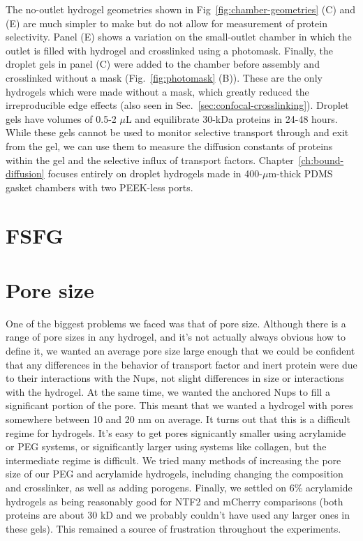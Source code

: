 The no-outlet hydrogel geometries shown in Fig~\ref{fig:chamber-geometries} (C) and (E) are much simpler to make but do not allow for measurement of protein selectivity.  Panel (E) shows a variation on the small-outlet chamber in which the outlet is filled with hydrogel and crosslinked using a photomask. Finally, the droplet gels in panel (C) were added to the chamber before assembly and crosslinked without a mask (Fig.~\ref{fig:photomask} (B)).  These are the only hydrogels which were made without a mask, which greatly reduced the irreproducible edge effects (also seen in Sec.~\ref{sec:confocal-crosslinking}).  Droplet gels have volumes of 0.5-2 $\mu$L and equilibrate 30-kDa proteins in 24-48 hours.  While these gels cannot be used to monitor selective transport through and exit from the gel, we can use them to measure the diffusion constants of proteins within the gel and the selective influx of transport factors.  Chapter~\ref{ch:bound-diffusion} focuses entirely on droplet hydrogels made in 400-$\mu$m-thick PDMS gasket chambers with two PEEK-less ports.

\section{FSFG}



\section{Pore size}

One of the biggest problems we faced was that of pore size.  Although there is a range of pore sizes in any hydrogel, and it's not actually always obvious how to define it, we wanted an average pore size large enough that we could be confident that any differences in the behavior of transport factor and inert protein were due to their interactions with the Nups, not slight differences in size or interactions with the hydrogel.  At the same time, we wanted the anchored Nups to fill a significant portion of the pore.  This meant that we wanted a hydrogel with pores somewhere between 10 and 20 nm on average.  It turns out that this is a difficult regime for hydrogels.  It's easy to get pores signicantly smaller using acrylamide or PEG systems, or significantly larger using systems like collagen, but the intermediate regime is difficult.  We tried many methods of increasing the pore size of our PEG and acrylamide hydrogels, including changing the composition and crosslinker, as well as adding porogens.  Finally, we settled on 6\% acrylamide hydrogels as being reasonably good for NTF2 and mCherry comparisons (both proteins are about 30 kD and we probably couldn't have used any larger ones in these gels).  This remained a source of frustration throughout the experiments.

